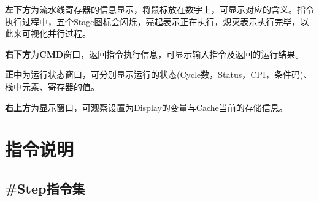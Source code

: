 \documentclass[12pt]{article} %
\begin{document}
\begin{sloppypar}
{\bf 左下方}为流水线寄存器的信息显示，将鼠标放在数字上，可显示对应的含义。指令执行过程中，五个Stage图标会闪烁，亮起表示正在执行，熄灭表示执行完毕，以此来可视化并行过程。



{\bf 右下方}为{\bf CMD}窗口，返回指令执行信息，可显示输入指令及返回的运行结果。


{\bf 正中}为运行状态窗口，可分别显示运行的状态(Cycle数，Status，CPI，条件码)、栈中元素、寄存器的值。


{\bf 右上方}为显示窗口，可观察设置为Display的变量与Cache当前的存储信息。

\clearpage
\section{指令说明}

\subsection{\#Step指令集}


\end{sloppypar}
\end{document}
